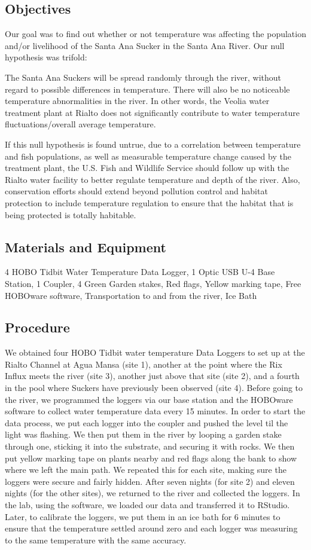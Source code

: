 \documentclass{article}
\begin{document}
\subsection{Objectives}
Our goal was to find out whether or not temperature was affecting the population and/or livelihood of the Santa Ana Sucker in the Santa Ana River. Our null hypothesis was trifold:


The Santa Ana Suckers will be spread randomly through the river, without regard to possible differences in temperature. 
There will also be no noticeable temperature abnormalities in the river. In other words, the Veolia water treatment plant at Rialto does not significantly contribute to water temperature fluctuations/overall average temperature. 


If this null hypothesis is found untrue, due to a correlation between temperature and fish populations, as well as measurable temperature change caused by the treatment plant, the U.S. Fish and Wildlife Service should follow up with the Rialto water facility to better regulate temperature and depth of the river. Also, conservation efforts should extend beyond pollution control and habitat protection to include temperature regulation to ensure that the habitat that is being protected is totally habitable.

\subsection{Materials and Equipment}

4 HOBO Tidbit Water Temperature Data Logger,
1 Optic USB U-4 Base Station,
1 Coupler,
4 Green Garden stakes,
Red flags,
Yellow marking tape,
Free HOBOware software,
Transportation to and from the river,
Ice Bath

\subsection{Procedure}
We obtained four HOBO Tidbit water temperature Data Loggers to set up at the Rialto Channel at Agua Mansa (site 1), another at the point where the Rix Influx meets the river (site 3), another just above that site (site 2), and a fourth in the pool where Suckers have previously been observed (site 4). Before going to the river, we programmed the loggers via our base station and the HOBOware software to collect water temperature data every 15 minutes. In order to start the data process, we put each logger into the coupler and pushed the level til the light was flashing. We then put them in the river by looping a garden stake through one, sticking it into the substrate, and securing it with rocks. We then put yellow marking tape on plants nearby and red flags along the bank to show where we left the main path. We repeated this for each site, making sure the loggers were secure and fairly hidden. After seven nights (for site 2) and eleven nights (for the other sites), we returned to the river and collected the loggers. In the lab, using the software, we loaded our data and transferred it to RStudio. Later, to calibrate the loggers, we put them in an ice bath for 6 minutes to ensure that the temperature settled around zero and each logger was measuring to the same temperature with the same accuracy.
\end{document}
